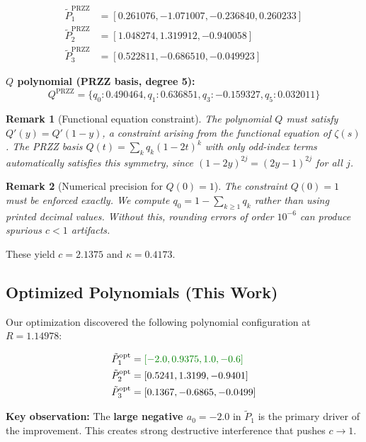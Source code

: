 \documentclass[11pt]{article}
\newtheorem{remark}{Remark}
\begin{document}
\begin{align}
\tilde{P}_1^{\text{PRZZ}} &= [0.261076, -1.071007, -0.236840, 0.260233] \\
\tilde{P}_2^{\text{PRZZ}} &= [1.048274, 1.319912, -0.940058] \\
\tilde{P}_3^{\text{PRZZ}} &= [0.522811, -0.686510, -0.049923]
\end{align}

\textbf{$Q$ polynomial (PRZZ basis, degree 5):}
\begin{equation}
Q^{\text{PRZZ}} = \{q_0: 0.490464, q_1: 0.636851, q_3: -0.159327, q_5: 0.032011\}
\end{equation}

\begin{remark}[Functional equation constraint]
The polynomial $Q$ must satisfy $Q'(y) = Q'(1-y)$, a constraint arising from
the functional equation of $\zeta(s)$ \cite{Conrey1989,Farmer2025}. The PRZZ basis
$Q(t) = \sum_k q_k (1-2t)^k$ with only odd-index terms automatically satisfies
this symmetry, since $(1-2y)^{2j} = (2y-1)^{2j}$ for all $j$.
\end{remark}

\begin{remark}[Numerical precision for $Q(0) = 1$]
\label{rem:Q-precision}
The constraint $Q(0) = 1$ must be enforced exactly. We compute $q_0 = 1 - \sum_{k \geq 1} q_k$ rather than using printed decimal values. Without this, rounding errors of order $10^{-6}$ can produce spurious $c < 1$ artifacts.
\end{remark}

These yield $c = 2.1375$ and $\kappa = 0.4173$.

\subsection{Optimized Polynomials (This Work)}

Our optimization discovered the following polynomial configuration at $R = 1.14978$:

\begin{align}
\tilde{P}_1^{\text{opt}} &= \textcolor{improvement}{[-2.0, 0.9375, 1.0, -0.6]} \\
\tilde{P}_2^{\text{opt}} &= [0.5241, 1.3199, -0.9401] \\
\tilde{P}_3^{\text{opt}} &= [0.1367, -0.6865, -0.0499]
\end{align}

\textbf{Key observation:} The \textcolor{improvement}{\textbf{large negative $a_0 = -2.0$}} in $\tilde{P}_1$ is the primary driver of the improvement. This creates strong destructive interference that pushes $c \to 1$.
\end{document}
